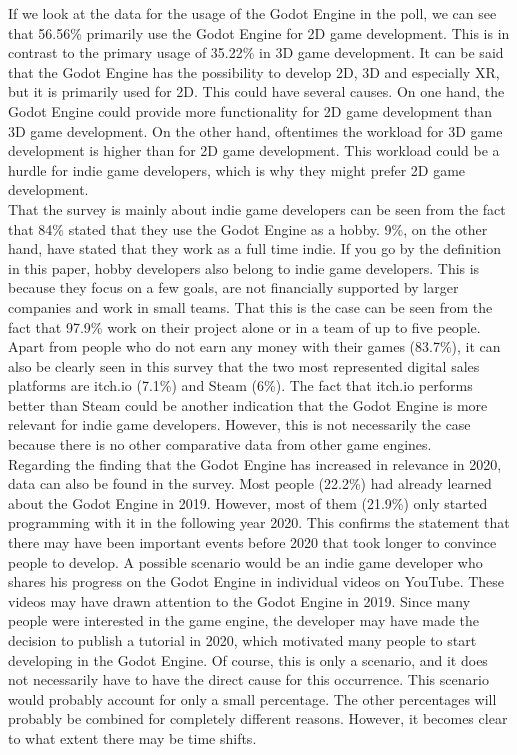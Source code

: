 If we look at the data for the usage of the Godot Engine in the poll, we can see that 56.56\% primarily use the Godot Engine for 2D game development.
This is in contrast to the primary usage of 35.22\% in 3D game development.
It can be said that the Godot Engine has the possibility to develop 2D, 3D and especially XR, but it is primarily used for 2D.
This could have several causes.
On one hand, the Godot Engine could provide more functionality for 2D game development than 3D game development.
On the other hand, oftentimes the workload for 3D game development is higher than for 2D game development.
This workload could be a hurdle for indie game developers, which is why they might prefer 2D game development.\\

That the survey is mainly about indie game developers can be seen from the fact that 84\% stated that they use the Godot Engine as a hobby.
9\%, on the other hand, have stated that they work as a full time indie.
If you go by the definition in this paper, hobby developers also belong to indie game developers.
This is because they focus on a few goals, are not financially supported by larger companies and work in small teams.
That this is the case can be seen from the fact that 97.9\% work on their project alone or in a team of up to five people.
Apart from people who do not earn any money with their games (83.7\%), it can also be clearly seen in this survey that the two most represented digital sales platforms are itch.io (7.1\%) and Steam (6\%).
The fact that itch.io performs better than Steam could be another indication that the Godot Engine is more relevant for indie game developers.
However, this is not necessarily the case because there is no other comparative data from other game engines. \\

Regarding the finding that the Godot Engine has increased in relevance in 2020, data can also be found in the survey.
Most people (22.2\%) had already learned about the Godot Engine in 2019.
However, most of them (21.9\%) only started programming with it in the following year 2020.
This confirms the statement that there may have been important events before 2020 that took longer to convince people to develop.
A possible scenario would be an indie game developer who shares his progress on the Godot Engine in individual videos on YouTube.
These videos may have drawn attention to the Godot Engine in 2019.
Since many people were interested in the game engine, the developer may have made the decision to publish a tutorial in 2020, which motivated many people to start developing in the Godot Engine.
Of course, this is only a scenario, and it does not necessarily have to have the direct cause for this occurrence.
This scenario would probably account for only a small percentage.
The other percentages will probably be combined for completely different reasons.
However, it becomes clear to what extent there may be time shifts.
